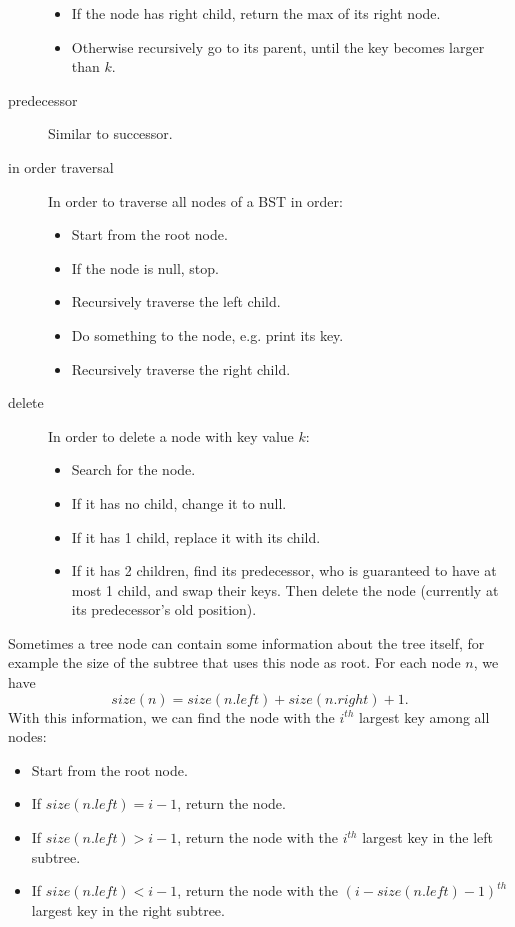 \begin{description}
\begin{itemize}
\item If the node has right child, return the max of its right node.
\item Otherwise recursively go to its parent, until the key becomes larger than $k$.
\end{itemize}
\item[predecessor]Similar to successor.
\item[in order traversal]In order to traverse all nodes of a BST in order:
\begin{itemize}
\item Start from the root node.
\item If the node is null, stop.
\item Recursively traverse the left child.
\item Do something to the node, e.g. print its key.
\item Recursively traverse the right child.
\end{itemize}
\item[delete]In order to delete a node with key value $k$:
\begin{itemize}
\item Search for the node.
\item If it has no child, change it to null.
\item If it has 1 child, replace it with its child.
\item If it has 2 children, find its predecessor, who is guaranteed to have at most 1 child, and swap their keys. Then delete the node (currently at its predecessor's old position).
\end{itemize}
\end{description}
Sometimes a tree node can contain some information about the tree itself, for example the size of the subtree that uses this node as root. For each node $n$, we have
$$size(n) = size(n.left) + size(n.right) + 1.$$
With this information, we can find the node with the $i^{th}$ largest key among all nodes:
\begin{itemize}
\item Start from the root node.
\item If $size(n.left) = i - 1$, return the node.
\item If $size(n.left) > i - 1$, return the node with the $i^{th}$ largest key in the left subtree.
\item If $size(n.left) < i - 1$, return the node with the $(i-size(n.left)-1)^{th}$ largest key in the right subtree.
\end{itemize}
